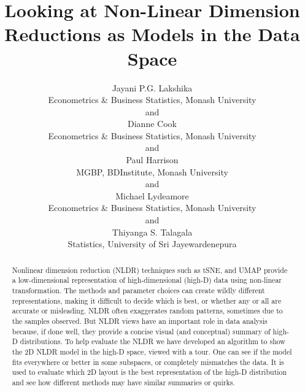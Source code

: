 \documentclass[
  12pt]{article}
\begin{document}
\def\spacingset#1{\renewcommand{\baselinestretch}%
{#1}\small\normalsize} \spacingset{1}


\title{\bf Looking at Non-Linear Dimension Reductions as Models in the
Data Space}
\author{
Jayani P.G. Lakshika\\
Econometrics \& Business Statistics, Monash University\\
and\\Dianne Cook\\
Econometrics \& Business Statistics, Monash University\\
and\\Paul Harrison\\
MGBP, BDInstitute, Monash University\\
and\\Michael Lydeamore\\
Econometrics \& Business Statistics, Monash University\\
and\\Thiyanga S. Talagala\\
Statistics, University of Sri Jayewardenepura\\
}
\maketitle

\bigskip
\bigskip
\begin{abstract}
Nonlinear dimension reduction (NLDR) techniques such as tSNE, and UMAP
provide a low-dimensional representation of high-dimensional (high-D)
data using non-linear transformation. The methods and parameter choices
can create wildly different representations, making it difficult to
decide which is best, or whether any or all are accurate or misleading.
NLDR often exaggerates random patterns, sometimes due to the samples
observed. But NLDR views have an important role in data analysis
because, if done well, they provide a concise visual (and conceptual)
summary of high-D distributions. To help evaluate the NLDR we have
developed an algorithm to show the 2D NLDR model in the high-D space,
viewed with a tour. One can see if the model fits everywhere or better
in some subspaces, or completely mismatches the data. It is used to
evaluate which 2D layout is the best representation of the high-D
distribution and see how different methods may have similar summaries or
quirks.
\end{abstract}
\end{document}
